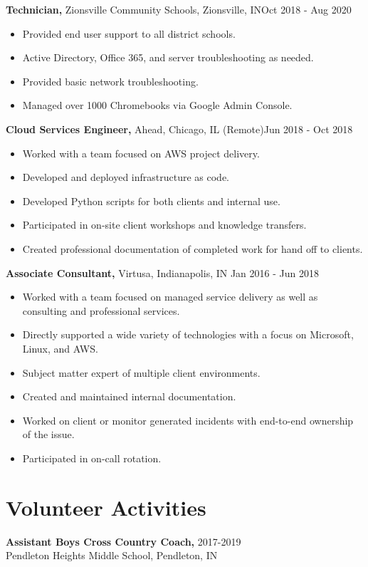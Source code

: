 \documentclass[margin]{res}
\begin{document}
\begin{resume}
 {\bf Technician,} Zionsville Community Schools, Zionsville, IN\hfill Oct 2018 - Aug 2020
 \begin{itemize} \itemsep -2pt  %
 \item Provided end user support to all district schools.
 \item Active Directory, Office 365, and server troubleshooting as needed.
 \item Provided basic network troubleshooting.
 \item Managed over 1000 Chromebooks via Google Admin Console.
 \end{itemize}

{\bf Cloud Services Engineer,} Ahead, Chicago, IL (Remote)\hfill Jun 2018 - Oct 2018 
\begin{itemize} \itemsep -2pt %
\item Worked with a team focused on AWS project delivery.
\item Developed and deployed infrastructure as code.
\item Developed Python scripts for both clients and internal use.
\item Participated in on-site client workshops and knowledge transfers.
\item Created professional documentation of completed work for hand off to clients.
\end{itemize}

{\bf Associate Consultant,} Virtusa, Indianapolis, IN \hfill Jan 2016 - Jun 2018               
\begin{itemize} \itemsep -2pt
\item Worked with a team focused on managed service delivery as well as consulting and professional services.
\item Directly supported a wide variety of technologies with a focus on Microsoft, Linux, and AWS.
\item Subject matter expert of multiple client environments.
\item Created and maintained internal documentation.
\item Worked on client or monitor generated incidents with end-to-end ownership of the issue.
\item Participated in on-call rotation.
\end{itemize}

\section{Volunteer Activities} 
               {\bf Assistant Boys Cross Country Coach,} \hfill2017-2019\\
               Pendleton Heights Middle School, Pendleton, IN


\end{resume}
\end{document}

